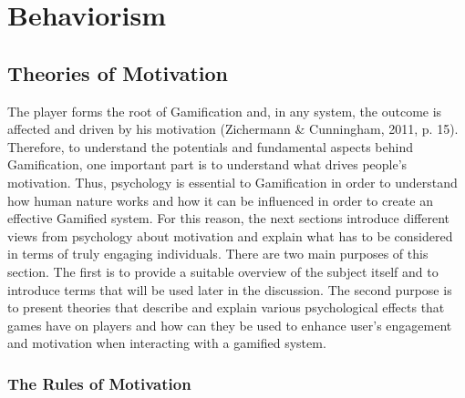 \chapter{Behaviorism}\label{chapter:behaviorism}


\section{Theories of Motivation}
The player forms the root of Gamification and, in any system, the outcome is affected and driven by his motivation (Zichermann \& Cunningham, 2011, p. 15). Therefore, to understand the potentials and fundamental aspects behind Gamification, one important part is to understand what drives people's motivation. Thus, psychology is  essential  to  Gamification  in order to understand  how  human  nature  works  and  how  it can  be  influenced  in  order  to  create  an  effective  Gamified  system. For this reason, the next sections introduce different views from psychology about motivation and explain what has to be considered in terms of truly engaging individuals. There are two main purposes of this section. The first is to provide a suitable overview of the subject itself and to introduce terms that will be used later in the discussion. The second purpose is to present theories that describe and explain various psychological effects that games have on players and how can they be used to enhance user's engagement and motivation when interacting with a gamified system.

\subsection{The Rules of Motivation}

